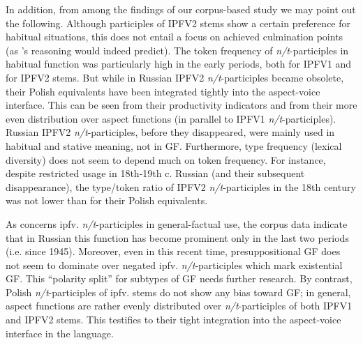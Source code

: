 \documentclass[output=paper]{langscibook}
\begin{document}
In addition, from among the findings of our corpus-based study we may point out the following. Although participles of IPFV2 stems show a certain preference for habitual situations, this does not entail a focus on achieved culmination points (as \citeauthor{Tatevosov2015Akcional}'s \citeyear{Tatevosov2015Akcional} reasoning would indeed predict). The token frequency of \textit{n/t}-participles in habitual function was particularly high in the early periods, both for IPFV1 and for IPFV2 stems. But while in Russian IPFV2 \textit{n/t}-participles became obsolete, their Polish equivalents have been integrated tightly into the aspect-voice interface. This can be seen from their productivity indicators and from their more even distribution over aspect functions (in parallel to IPFV1 \textit{n/t}-participles). Russian IPFV2 \textit{n/t}-participles, before they disappeared, were mainly used in habitual and stative meaning, not in GF. Furthermore, type frequency (lexical diversity) does not seem to depend much on token frequency. For instance, despite restricted usage in 18th-19th c. Russian (and their subsequent disappearance), the type/token ratio of IPFV2 \textit{n/t}-participles in the 18th century was not lower than for their Polish equivalents.

As concerns ipfv. \textit{n/t}-participles in general-factual use, the corpus data indicate that in Russian this function has become prominent only in the last two periods (i.e. since 1945). Moreover, even in this recent time, presuppositional GF does not seem to dominate over negated ipfv. \textit{n/t}-participles which mark existential GF. This “polarity split” for subtypes of GF needs further research. By contrast, Polish \textit{n/t}-participles of ipfv. stems do not show any bias toward GF; in general, aspect functions are rather evenly distributed over \textit{n/t}-participles of both IPFV1 and IPFV2 stems. This testifies to their tight integration into the aspect-voice interface in the language.
\end{document}
